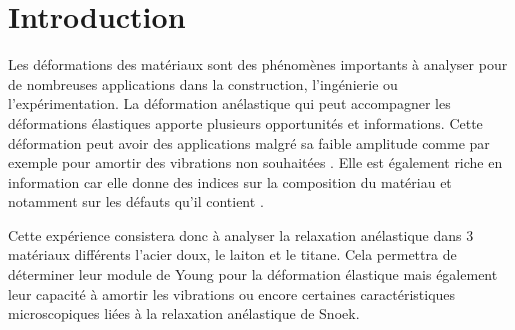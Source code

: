 \section{Introduction}
Les déformations des matériaux sont des phénomènes importants à analyser pour de nombreuses applications dans la construction, l'ingénierie ou l'expérimentation. La déformation anélastique qui peut accompagner les déformations élastiques apporte plusieurs opportunités et informations. Cette déformation peut avoir des applications malgré sa faible amplitude comme par exemple pour amortir des vibrations non souhaitées \cite{damp-damp}. Elle est également riche en information car elle donne des indices sur la composition du matériau et notamment sur les défauts qu'il contient \cite{notice}.

Cette expérience consistera donc à analyser la relaxation anélastique dans 3 matériaux différents l'acier doux, le laiton et le titane. Cela permettra de déterminer leur module de Young pour la déformation élastique mais également leur capacité à amortir les vibrations ou encore certaines caractéristiques microscopiques liées à la relaxation anélastique de Snoek.